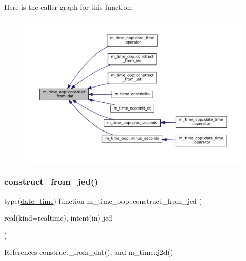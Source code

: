 Here is the caller graph for this function\+:\nopagebreak
\begin{figure}[H]
\begin{center}
\leavevmode
\includegraphics[width=350pt]{namespacem__time__oop_ae43c4146d74863b5aee027ebc0103f48_icgraph}
\end{center}
\end{figure}
\mbox{\label{namespacem__time__oop_ac7d9aa1885c2b8df613541be8a147064}} 
\subsubsection{\texorpdfstring{construct\+\_\+from\+\_\+jed()}{construct\_from\_jed()}}
{\footnotesize\ttfamily type(\mbox{\hyperlink{structm__time__oop_1_1date__time}{date\+\_\+time}}) function m\+\_\+time\+\_\+oop\+::construct\+\_\+from\+\_\+jed (\begin{DoxyParamCaption}\item[{real(kind=realtime), intent(in)}]{jed }\end{DoxyParamCaption})\hspace{0.3cm}{\ttfamily [private]}}



References construct\+\_\+from\+\_\+dat(), and m\+\_\+time\+::j2d().

